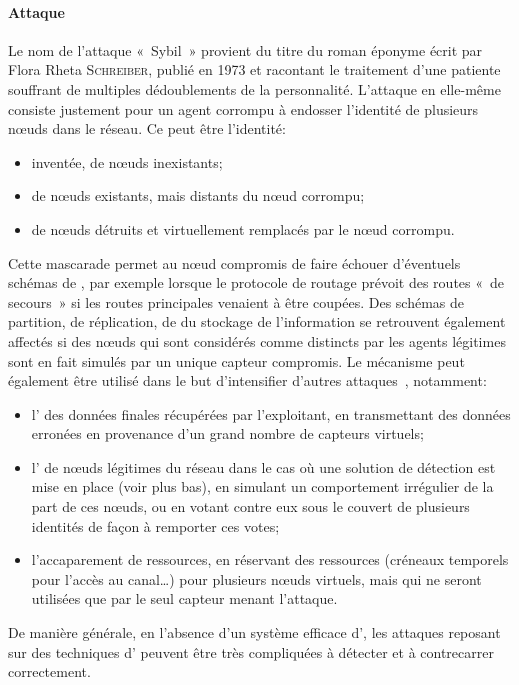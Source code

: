         \paragraph{Attaque }
Le nom de l'attaque « Sybil » provient du titre du roman éponyme écrit par Flora Rheta \textsc{Schreiber}, publié en 1973 et racontant le traitement d'une patiente souffrant de multiples dédoublements de la personnalité.
L'attaque en elle-même consiste justement pour un agent corrompu à endosser l'identité de plusieurs nœuds dans le réseau.
Ce peut être l'identité:
\begin{itemize}
    \item inventée, de nœuds inexistants;
    \item de nœuds existants, mais distants du nœud corrompu;
    \item de nœuds détruits et virtuellement remplacés par le nœud corrompu.
\end{itemize}
Cette mascarade permet au nœud compromis de faire échouer d'éventuels schémas de \resilience, par exemple lorsque le protocole de routage prévoit des routes « de secours » si les routes principales venaient à être coupées.
Des schémas de partition, de réplication, de  du stockage de l'information se retrouvent également affectés si des nœuds qui sont considérés comme distincts par les agents légitimes sont en fait simulés par un unique capteur compromis.
Le mécanisme peut également être utilisé dans le but d'intensifier d'autres attaques~\cite{NSSP04}, notamment:
\begin{itemize}
    \item l' des données finales récupérées par l'exploitant, en transmettant des données erronées en provenance d'un grand nombre de capteurs virtuels;
    \item l' de nœuds légitimes du réseau dans le cas où une solution de détection est mise en place (voir plus bas), en simulant un comportement irrégulier de la part de ces nœuds, ou en votant contre eux sous le couvert de plusieurs identités de façon à remporter ces votes;
    \item l'accaparement de ressources, en réservant des ressources (créneaux temporels pour l'accès au canal\dots) pour plusieurs nœuds virtuels, mais qui ne seront utilisées que par le seul capteur menant l'attaque.
\end{itemize}
De manière générale, en l'absence d'un système efficace d', les attaques reposant sur des techniques d' peuvent être très compliquées à détecter et à contrecarrer correctement.

